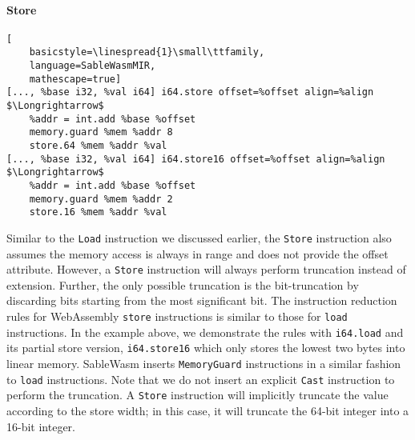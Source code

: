 \paragraph{Store} \quad
\begin{lstlisting}[
    basicstyle=\linespread{1}\small\ttfamily, 
    language=SableWasmMIR, 
    mathescape=true]
[..., %base i32, %val i64] i64.store offset=%offset align=%align $\Longrightarrow$
    %addr = int.add %base %offset
    memory.guard %mem %addr 8
    store.64 %mem %addr %val
[..., %base i32, %val i64] i64.store16 offset=%offset align=%align $\Longrightarrow$
    %addr = int.add %base %offset
    memory.guard %mem %addr 2
    store.16 %mem %addr %val
\end{lstlisting}
Similar to the \texttt{Load} instruction we discussed earlier, the
\texttt{Store} instruction also assumes the memory access is always in range and
does not provide the offset attribute. However, a \texttt{Store} instruction
will always perform truncation instead of extension. Further, the only possible
truncation is the bit-truncation by discarding bits starting from the most
significant bit. The instruction reduction rules for WebAssembly \texttt{store}
instructions is similar to those for \texttt{load} instructions. In the example
above, we demonstrate the rules with \texttt{i64.load} and its partial store
version, \texttt{i64.store16} which only stores the lowest two bytes into linear
memory. SableWasm inserts \texttt{MemoryGuard} instructions in a similar fashion
to \texttt{load} instructions. Note that we do not insert an explicit
\texttt{Cast} instruction to perform the truncation. A \texttt{Store}
instruction will implicitly truncate the value according to the store width; in
this case, it will truncate the 64-bit integer into a 16-bit integer.

